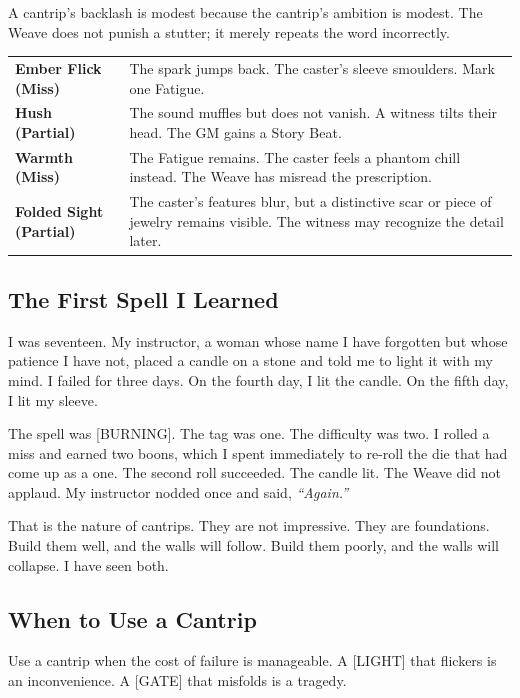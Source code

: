 A cantrip's backlash is modest because the cantrip's ambition is modest. The Weave does not punish a stutter; it merely repeats the word incorrectly.

\noindent
\begin{tabular}{p{} p{}}
\textbf{Ember Flick (Miss)} & The spark jumps back. The caster's sleeve smoulders. Mark one Fatigue. \\
\textbf{Hush (Partial)} & The sound muffles but does not vanish. A witness tilts their head. The GM gains a Story Beat. \\
\textbf{Warmth (Miss)} & The Fatigue remains. The caster feels a phantom chill instead. The Weave has misread the prescription. \\
\textbf{Folded Sight (Partial)} & The caster's features blur, but a distinctive scar or piece of jewelry remains visible. The witness may recognize the detail later. \\
\end{tabular}

\subsection{The First Spell I Learned}

I was seventeen. My instructor, a woman whose name I have forgotten but whose patience I have not, placed a candle on a stone and told me to light it with my mind. I failed for three days. On the fourth day, I lit the candle. On the fifth day, I lit my sleeve.

The spell was [BURNING]. The tag was one. The difficulty was two. I rolled a miss and earned two boons, which I spent immediately to re-roll the die that had come up as a one. The second roll succeeded. The candle lit. The Weave did not applaud. My instructor nodded once and said, \emph{``Again.''}

That is the nature of cantrips. They are not impressive. They are foundations. Build them well, and the walls will follow. Build them poorly, and the walls will collapse. I have seen both.

\subsection{When to Use a Cantrip}

Use a cantrip when the cost of failure is manageable. A [LIGHT] that flickers is an inconvenience. A [GATE] that misfolds is a tragedy.

